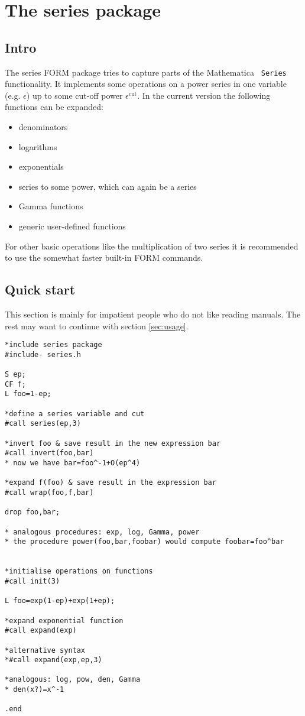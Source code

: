 \documentclass{article}
\begin{document}
\section{The series package}

\subsection{Intro}

The series FORM package tries to capture parts of the Mathematica {\tt
  Series} functionality. It implements some operations on a power
series in one variable
(e.g. $\epsilon$) up to some cut-off power $\epsilon^{\text{cut}}$. In
the current version the following functions can be expanded:
\begin{itemize}
\item denominators
\item logarithms
\item exponentials
\item series to some power, which can again be a series
\item Gamma functions
\item generic user-defined functions
\end{itemize}
For other basic operations like the multiplication of two series it
is recommended to use the somewhat faster built-in FORM commands.

\subsection{Quick start}
\label{sec:quick}

This section is mainly for impatient people who do not like reading
manuals. The rest may want to continue with section \ref{sec:usage}.

\begin{verbatim}
*include series package
#include- series.h

S ep;
CF f;
L foo=1-ep;

*define a series variable and cut
#call series(ep,3)

*invert foo & save result in the new expression bar
#call invert(foo,bar)
* now we have bar=foo^-1+O(ep^4)

*expand f(foo) & save result in the expression bar
#call wrap(foo,f,bar)

drop foo,bar;

* analogous procedures: exp, log, Gamma, power
* the procedure power(foo,bar,foobar) would compute foobar=foo^bar


*initialise operations on functions
#call init(3)

L foo=exp(1-ep)+exp(1+ep);

*expand exponential function
#call expand(exp)

*alternative syntax
*#call expand(exp,ep,3)

*analogous: log, pow, den, Gamma
* den(x?)=x^-1

.end
\end{verbatim}
\end{document}
